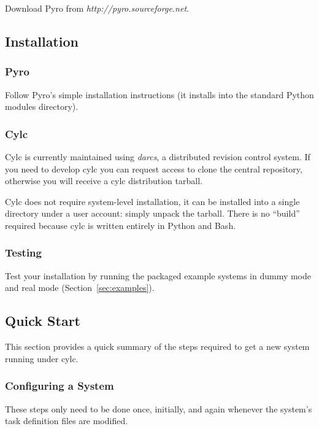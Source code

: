 \documentclass[11pt,a4paper]{article}
\begin{document}
Download Pyro from {\em http://pyro.sourceforge.net}. 

\subsection{Installation}

\subsubsection{Pyro}

Follow Pyro's simple installation instructions (it installs into the
standard Python modules directory).

\subsubsection{Cylc}

Cylc is currently maintained using {\em darcs}, a distributed revision
control system. If you need to develop cylc you can request access to
clone the central repository, otherwise you will receive a cylc
distribution tarball.

Cylc does not require system-level installation, it can be installed
into a single directory under a user account: simply unpack the
tarball. There is no ``build'' required because cylc is written entirely 
in Python and Bash.

\subsubsection{Testing}

Test your installation by running the packaged example systems in dummy
mode and real mode (Section~\ref{sec:examples}).

\pagebreak
\subsection{Quick Start}

This section provides a quick summary of the steps required to get a new
system running under cylc.

\subsubsection{Configuring a System}

These steps only need to be done once, initially, and again whenever the system's task 
definition files are modified. 
\end{document}
